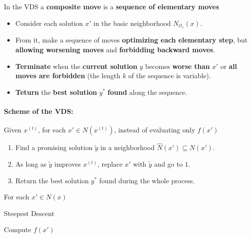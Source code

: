 \documentclass[11pt]{article}
\begin{document}
	In the VDS a \textbf{composite move} is a \textbf{sequence of elementary moves}
	\begin{itemize}
		\item Consider each solution $x'$ in the basic neighborhood $N_{\mathcal{O}_1} (x)$.\\
		
		\item From it, make a sequence of moves \textbf{optimizing each elementary step}, but \textbf{allowing worsening moves} and \textbf{forbidding backward moves}.\\
		
		\item \textbf{Terminate} when the \textbf{current solution} $y$ becomes \textbf{worse than} $x'$ or \textbf{all moves are forbidden} (the length $k$ of the sequence is variable).\\
		
		\item \textbf{Teturn} the \textbf{best solution} $y^\ast$ \textbf{found} along the sequence.\\
	\end{itemize}
	
	\paragraph{Scheme of the VDS:} Given $x^{(t)}$, for each $x' \in N (x^{(t)})$, instead of evaluating only $f (x')$
	\begin{enumerate}
		\item Find a promising solution $\tilde{y}$ in a neighborhood $\hat{N} (x') \subseteq N (x')$.\\
		
		\item As long as $\tilde{y}$ improves $x^{(t)}$, replace $x'$ with $\tilde{y}$ and go to $1$.\\
		
		\item Return the best solution $y^\ast$ found during the whole process.\\
	\end{enumerate}
	
	\newpage
	
	\begin{center}
		For each $x' \in N (x)$
	\end{center}
	
	\begin{algorithm}
		\caption{Steepest Descent}
		\begin{algorithmic}
			\STATE Compute $f(x')$
		\end{algorithmic}
	\end{algorithm}
		
\end{document}
